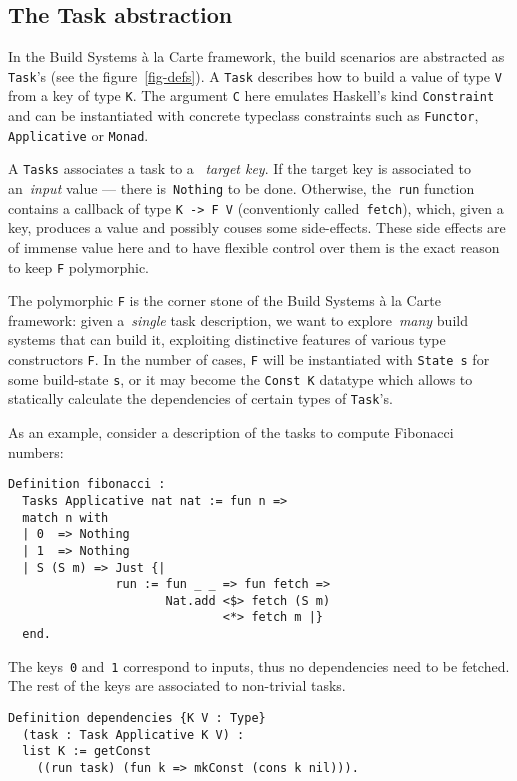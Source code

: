 \documentclass[sigplan,review]{acmart}\settopmatter{printfolios=true,printccs=false,printacmref=false}
\newcommand{\hs}{\texttt}
\newcommand{\coq}{\texttt}
\begin{document}
\vspace{-3mm}
\subsection{The Task abstraction}

In the Build Systems \`a la Carte framework, the build scenarios are abstracted
as \hs{Task}'s (see the figure~\ref{fig-defs}). A \hs{Task}
describes how to build a value of type \hs{V} from a key of type \hs{K}.
The argument \hs{C} here emulates Haskell's kind \hs{Constraint} and can be
instantiated with concrete typeclass constraints such as \hs{Functor},
\hs{Applicative} or \hs{Monad}.

A \hs{Tasks} associates a task to a ~\emph{target key}.
If the target key is associated to an~\emph{input}
value --- there is~\hs{Nothing} to be done. Otherwise, the~\hs{run} function
contains a callback of type \hs{K -> F V} (conventionly called~\hs{fetch}),
which, given a key, produces a value and possibly couses some side-effects.
These side effects are of immense value here and to have flexible control over them
is the exact reason to keep \hs{F} polymorphic.

The polymorphic \hs{F} is the corner stone of the Build Systems \`a la Carte
framework: given a~\emph{single} task description, we want to explore~\emph{many}
build systems that can build it, exploiting distinctive features of various
type constructors \hs{F}. In the number of cases, \hs{F} will be instantiated
with \hs{State s} for some build-state \hs{s}, or it may become the
\hs{Const K} datatype which allows to statically calculate the dependencies of certain
types of \hs{Task}'s.

As an example, consider a description of the tasks to compute Fibonacci numbers:

\begin{verbatim}
Definition fibonacci :
  Tasks Applicative nat nat := fun n =>
  match n with
  | 0  => Nothing
  | 1  => Nothing
  | S (S m) => Just {|
               run := fun _ _ => fun fetch =>
                      Nat.add <$> fetch (S m)
                              <*> fetch m |}
  end.
\end{verbatim}

The keys~\coq{0} and~\coq{1} correspond to inputs, thus no dependencies need to
be fetched. The rest of the keys are associated to non-trivial tasks.

\begin{verbatim}
Definition dependencies {K V : Type}
  (task : Task Applicative K V) :
  list K := getConst
    ((run task) (fun k => mkConst (cons k nil))).
\end{verbatim}
\end{document}
